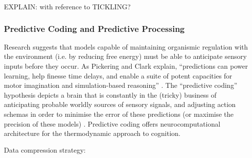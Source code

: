 \begin{CJK}{UTF8}{gbsn}
EXPLAIN: with reference to TICKLING?







\subsubsection{Predictive Coding and Predictive Processing}
Research suggests that models capable of maintaining organismic regulation with the environment (i.e. by reducing free energy) must be able to anticipate sensory inputs before they occur. As Pickering and Clark explain, ``predictions can power learning, help finesse time delays, and enable a suite of potent capacities for motor imagination and simulation-based reasoning'' \citep[6]{Pickering2014}.  The ``predictive coding'' hypothesis depicts a brain that is constantly in the (tricky) business of anticipating probable worldly sources of sensory signals, and adjusting action schemas in order to minimise the error of these predictions (or maximise the precision of these models) \citep{Friston2010,Clark2013}. Predictive coding offers neurocomputational architecture for the thermodynamic approach to cognition.

Data compression strategy:


\end{CJK}
